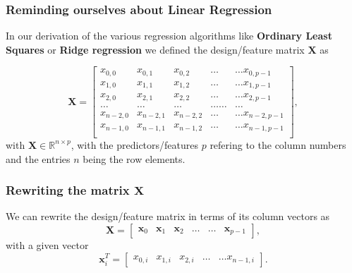 \documentclass{beamer}
\begin{document}
\begin{frame}
\frametitle{Reminding ourselves about Linear Regression}

In our derivation of the various regression algorithms like \textbf{Ordinary Least Squares} or \textbf{Ridge regression}
we defined the design/feature matrix $\bm{X}$ as

\[
\bm{X}=\begin{bmatrix}
x_{0,0} & x_{0,1} & x_{0,2}& \dots & \dots x_{0,p-1}\\
x_{1,0} & x_{1,1} & x_{1,2}& \dots & \dots x_{1,p-1}\\
x_{2,0} & x_{2,1} & x_{2,2}& \dots & \dots x_{2,p-1}\\
\dots & \dots & \dots & \dots \dots & \dots \\
x_{n-2,0} & x_{n-2,1} & x_{n-2,2}& \dots & \dots x_{n-2,p-1}\\
x_{n-1,0} & x_{n-1,1} & x_{n-1,2}& \dots & \dots x_{n-1,p-1}\\
\end{bmatrix},
\]
with $\bm{X}\in {\mathbb{R}}^{n\times p}$, with the predictors/features $p$  refering to the column numbers and the
entries $n$ being the row elements.
\end{frame}

\begin{frame}
\frametitle{Rewriting the matrix $\bm{X}$}

We can rewrite the design/feature matrix in terms of its column vectors as
\[
\bm{X}=\begin{bmatrix} \bm{x}_0 & \bm{x}_1 & \bm{x}_2 & \dots & \dots & \bm{x}_{p-1}\end{bmatrix},
\]
with a given vector
\[
\bm{x}_i^T = \begin{bmatrix}x_{0,i} & x_{1,i} & x_{2,i}& \dots & \dots x_{n-1,i}\end{bmatrix}.
\]
\end{frame}
\end{document}
